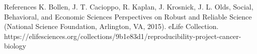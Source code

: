 \documentclass[12pt]{article}
\begin{document}
References
K. Bollen, J. T. Cacioppo, R. Kaplan, J. Krosnick, J. L. Olds, Social, Behavioral, and Economic Sciences Perspectives on Robust and Reliable Science (National Science Foundation, Arlington, VA, 2015).
eLife Collection. https://elifesciences.org/collections/9b1e83d1/reproducibility-project-cancer-biology 



 
\end{document}
